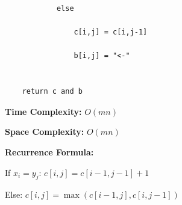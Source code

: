 \documentclass[a4paper,12pt]{article}
\begin{document}
\begin{tcolorbox}[
    colback=gray!30,
    colframe=black,
    boxrule=1pt,
    arc=0mm
]
\begin{tcolorbox}[
    colback=black!5,
    colframe=black,
    arc=0mm,
    title=Pseudo-code
]
\begin{lstlisting}
            else

                c[i,j] = c[i,j-1]

                b[i,j] = "<-"


    return c and b
\end{lstlisting}
\end{tcolorbox}


\begin{tcolorbox}[
    colback=cyan!20,
    colframe=black,
    arc=0mm
]
\small
\textbf{Time Complexity:}
$O(mn)$
\end{tcolorbox}


\begin{tcolorbox}[
    colback=violet!20,
    colframe=black,
    arc=0mm
]
\small
\textbf{Space Complexity:}
$O(mn)$
\end{tcolorbox}


\begin{tcolorbox}[
    colback=pink!20,
    colframe=black,
    arc=0mm
]
\small
\textbf{Recurrence Formula:}

If $x_i=y_j$:
$c[i,j]=c[i-1,j-1]+1$

Else:
$c[i,j]=\max(c[i-1,j],c[i,j-1])$
\end{tcolorbox}

\end{tcolorbox}
\end{document}
